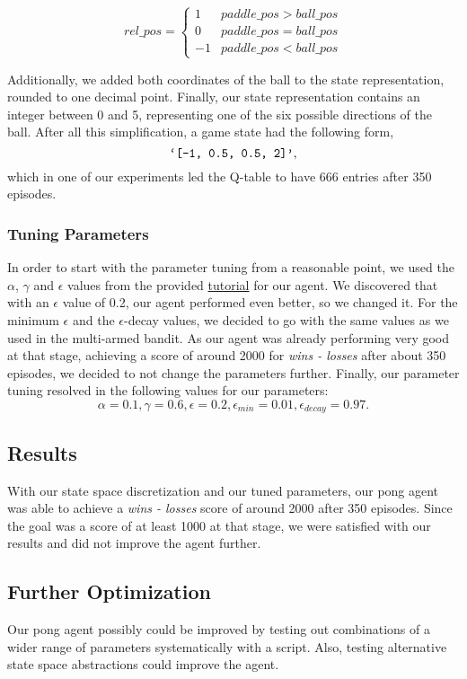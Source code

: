 \documentclass[10pt]{article}
\begin{document}
\[\mathit{rel\_pos} = \begin{cases}
                          1 & \mathit{paddle\_pos} > \mathit{ball\_pos} \\
                          0 & \mathit{paddle\_pos} = \mathit{ball\_pos} \\
                          -1 & \mathit{paddle\_pos} < \mathit{ball\_pos}
\end{cases}
\]

Additionally, we added both coordinates of the ball to the state representation, rounded to one decimal point.
Finally, our state representation contains an integer between 0 and 5, representing one of the six possible directions of the ball.
After all this simplification, a game state had the following form,\[\texttt{\lq[-1, 0.5, 0.5, 2]\rq},\] which in one of our experiments led the Q-table to have 666 entries after 350 episodes.

\subsubsection{Tuning Parameters}
In order to start with the parameter tuning from a reasonable point, we used the $\alpha$, $\gamma$ and $\epsilon$ values from the provided \href{https://www.learndatasci.com/tutorials/reinforcement-q-learning-scratch-python-openai-gym/}{tutorial} for our agent.
We discovered that with an $\epsilon$ value of 0.2, our agent performed even better, so we changed it.
For the minimum $\epsilon$ and the $\epsilon$-decay values, we decided to go with the same values as we used in the multi-armed bandit.
As our agent was already performing very good at that stage, achieving a score of around 2000 for \textit{wins - losses} after about 350 episodes, we decided to not change the parameters further.
Finally, our parameter tuning resolved in the following values for our parameters:
\[\alpha = 0.1, \gamma = 0.6, \epsilon = 0.2, \epsilon_\mathit{min} = 0.01, \epsilon_\mathit{decay} = 0.97.\]

\subsection{Results}\label{subsec:pong-results}
With our state space discretization and our tuned parameters, our pong agent was able to achieve a \textit{wins - losses} score of around 2000 after 350 episodes.
Since the goal was a score of at least 1000 at that stage, we were satisfied with our results and did not improve the agent further.

\subsection{Further Optimization}\label{subsec:pong-further-optimization}
Our pong agent possibly could be improved by testing out combinations of a wider range of parameters systematically with a script.
Also, testing alternative state space abstractions could improve the agent.
\end{document}
